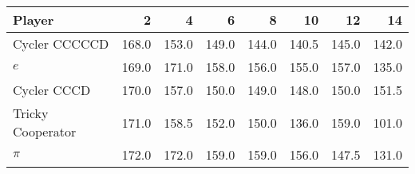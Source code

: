 \begin{tabular}{lrrrrrrr}
\toprule
            Player &      2 &      4 &      6 &      8 &     10 &     12 &     14 \\
\midrule
     Cycler CCCCCD &  168.0 &  153.0 &  149.0 &  144.0 &  140.5 &  145.0 &  142.0 \\
               $e$ &  169.0 &  171.0 &  158.0 &  156.0 &  155.0 &  157.0 &  135.0 \\
       Cycler CCCD &  170.0 &  157.0 &  150.0 &  149.0 &  148.0 &  150.0 &  151.5 \\
 Tricky Cooperator &  171.0 &  158.5 &  152.0 &  150.0 &  136.0 &  159.0 &  101.0 \\
             $\pi$ &  172.0 &  172.0 &  159.0 &  159.0 &  156.0 &  147.5 &  131.0 \\
\bottomrule
\end{tabular}
